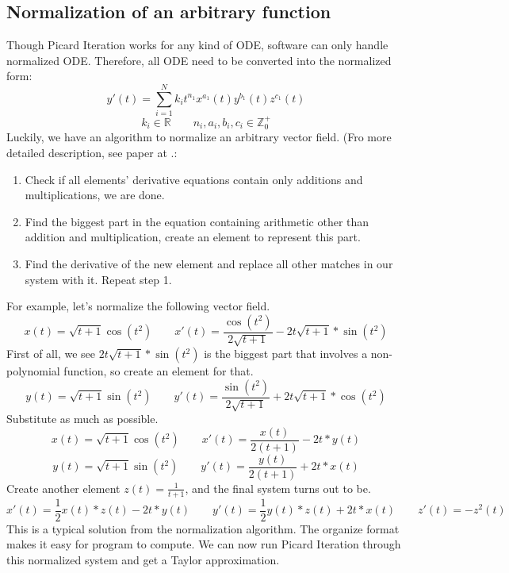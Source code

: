 \documentclass[12pt]{article}
\begin{document}
\subsection{Normalization of an arbitrary function}

Though Picard Iteration works for any kind of ODE, software can only handle normalized ODE. Therefore, all ODE need to be converted into the normalized form:
$$
y'(t) = \sum^N_{i=1} k_{i} t^{n_{1}} x^{a_{1}}(t) y^{b_{1}}(t) z^{c_{1}}(t) 
$$
$$
k_i \in \mathbb{R} \qquad n_i, a_i, b_i, c_i \in \mathbb{Z}^+_0
$$
Luckily, we have an algorithm to normalize an arbitrary vector field. (Fro more detailed description, see paper at \cite{NORMAL}.:
\begin{enumerate}
\item Check if all elements' derivative equations contain only additions and multiplications, we are done.
\item Find the biggest part in the equation containing arithmetic other than addition and multiplication, create an element to represent this part.
\item Find the derivative of the new element and replace all other matches in our system with it. Repeat step 1.
\end{enumerate}
For example, let's normalize the following vector field.
\begin{equation}
x(t) = \sqrt{t+1}\cos(t^2)  \qquad
x'(t) = \frac{\cos(t^2)}{2\sqrt{t+1}} - 2t\sqrt{t+1}*\sin(t^2)
\end{equation}
First of all, we see $2t\sqrt{t+1}*\sin(t^2)$ is the biggest part that involves a non-polynomial function, so create an element for that. 
\begin{equation}
y(t) = \sqrt{t+1}\sin(t^2)  \qquad
y'(t) = \frac{\sin(t^2)}{2\sqrt{t+1}} + 2t\sqrt{t+1}*\cos(t^2)
\end{equation}
Substitute as much as possible.
\begin{equation}
x(t) = \sqrt{t+1}\cos(t^2)  \qquad
x'(t) = \frac{x(t)}{2(t+1)} - 2t*y(t)
\end{equation}
\begin{equation}
y(t) = \sqrt{t+1}\sin(t^2)  \qquad
y'(t) = \frac{y(t)}{2(t+1)} + 2t*x(t)
\end{equation}
Create another element $z(t) = \frac{1}{t+1}$, and the final system turns out to be.
\begin{equation}
x'(t) = \frac{1}{2}x(t)*z(t) - 2t*y(t) \qquad
y'(t) = \frac{1}{2}y(t)*z(t) + 2t*x(t) \qquad
z'(t) = -z^{2}(t)
\end{equation}
This is a typical solution from the normalization algorithm. The organize format makes it easy for program to compute. We can now run Picard Iteration through this normalized system and get a Taylor approximation.
\end{document}
